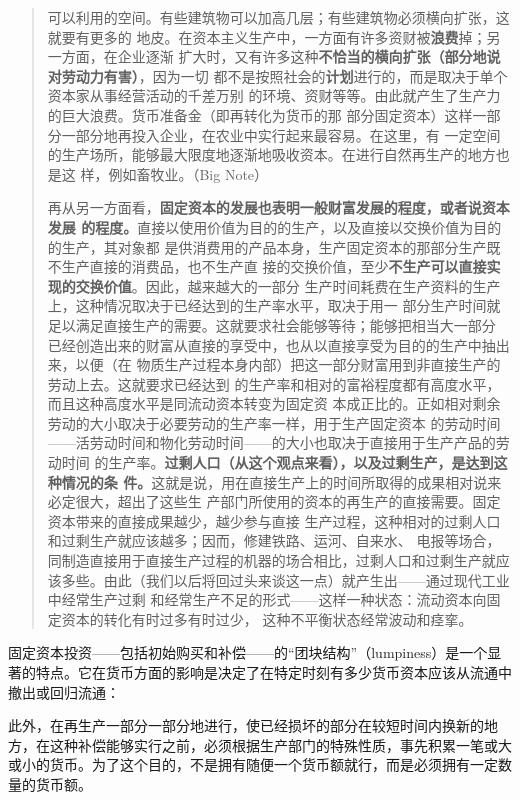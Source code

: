 \begin{quotation}
  可以利用的空间。有些建筑物可以加高几层；有些建筑物必须横向扩张，这就要有更多的
  地皮。在资本主义生产中，一方面有许多资财被\textbf{浪费}掉；另一方面，在企业逐渐
  扩大时，又有许多这种\textbf{不恰当的横向扩张（部分地说对劳动力有害）}，因为一切
  都不是按照社会的\textbf{计划}进行的，而是取决于单个资本家从事经营活动的千差万别
  的环境、资财等等。由此就产生了生产力的巨大浪费。货币准备金（即再转化为货币的那
  部分固定资本）这样一部分一部分地再投入企业，在农业中实行起来最容易。在这里，有
  一定空间的生产场所，能够最大限度地逐渐地吸收资本。在进行自然再生产的地方也是这
  样，例如畜牧业。（Big Note）

  再从另一方面看，\textbf{固定资本的发展也表明一般财富发展的程度，或者说资本发展
    的程度。}直接以使用价值为目的的生产，以及直接以交换价值为目的的生产，其对象都
  是供消费用的产品本身，生产固定资本的那部分生产既不生产直接的消费品，也不生产直
  接的交换价值，至少\textbf{不生产可以直接实现的交换价值}。因此，越来越大的一部分
  生产时间耗费在生产资料的生产上，这种情况取决于已经达到的生产率水平，取决于用一
  部分生产时间就足以满足直接生产的需要。这就要求社会能够等待；能够把相当大一部分
  已经创造出来的财富从直接的享受中，也从以直接享受为目的的生产中抽出来，以便（在
  物质生产过程本身内部）把这一部分财富用到非直接生产的劳动上去。这就要求已经达到
  的生产率和相对的富裕程度都有高度水平，而且这种高度水平是同流动资本转变为固定资
  本成正比的。正如相对剩余劳动的大小取决于必要劳动的生产率一样，用于生产固定资本
  的劳动时间——活劳动时间和物化劳动时间——的大小也取决于直接用于生产产品的劳动时间
  的生产率。\textbf{过剩人口（从这个观点来看），以及过剩生产，是达到这种情况的条
    件。}这就是说，用在直接生产上的时间所取得的成果相对说来必定很大，超出了这些生
  产部门所使用的资本的再生产的直接需要。固定资本带来的直接成果越少，越少参与直接
  生产过程，这种相对的过剩人口和过剩生产就应该越多；因而，修建铁路、运河、自来水、
  电报等场合，同制造直接用于直接生产过程的机器的场合相比，过剩人口和过剩生产就应
  该多些。由此（我们以后将回过头来谈这一点）就产生出——通过现代工业中经常生产过剩
  和经常生产不足的形式——这样一种状态：流动资本向固定资本的转化有时过多有时过少，
  这种不平衡状态经常波动和痉挛。 

\end{quotation}
固定资本投资——包括初始购买和补偿——的“团块结构”（lumpiness）是一个显著的特点。它在货币方面的影响是决定了在特定时刻有多少货币资本应该从流通中撤出或回归流通：

此外，在再生产一部分一部分地进行，使已经损坏的部分在较短时间内换新的地方，在这种补偿能够实行之前，必须根据生产部门的特殊性质，事先积累一笔或大或小的货币。为了这个目的，不是拥有随便一个货币额就行，而是必须拥有一定数量的货币额。 

